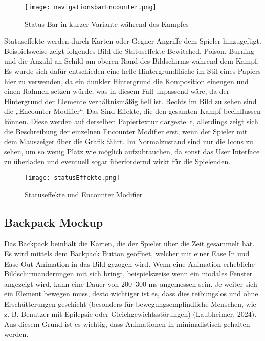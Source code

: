 \begin{figure}[H]
    \centering
    \texttt{[image: navigationsbarEncounter.png]}
    \caption{Status Bar in kurzer Variante während des Kampfes}
\end{figure}

Statuseffekte werden durch Karten oder Gegner-Angriffe dem Spieler hinzugefügt. Beispielsweise zeigt folgendes Bild die Statuseffekte Bewitched, Poison, Burning und die Anzahl an Schild am oberen Rand des Bildschirms während dem Kampf. Es wurde sich dafür entschieden eine helle Hintergrundfläche im Stil eines Papiers hier zu verwenden, da ein dunkler Hintergrund die Komposition einengen und einen Rahmen setzen würde, was in diesem Fall unpassend wäre, da der Hintergrund der Elemente verhältnismäßig hell ist. Rechts im Bild zu sehen sind die „Encounter Modifier“. Das Sind Effekte, die den gesamten Kampf beeinflussen können. Diese werden auf derselben Papiertextur dargestellt, allerdings zeigt sich die Beschreibung der einzelnen Encounter Modifier erst, wenn der Spieler mit dem Mauszeiger über die Grafik fährt. Im Normalzustand sind nur die Icons zu sehen, um so wenig Platz wie möglich aufzubrauchen, da sonst das User Interface zu überladen und eventuell sogar überfordernd wirkt für die Spielenden.

\begin{figure}[H]
    \centering
    \texttt{[image: statusEffekte.png]}
    \caption{Statuseffekte und Encounter Modifier}
\end{figure}

\subsection{Backpack Mockup}

Das Backpack beinhält die Karten, die der Spieler über die Zeit gesammelt hat. Es wird mittels dem Backpack Button geöffnet, welcher mit einer Ease In und Ease Out Animation in das Bild gezogen wird. Wenn eine Animation erhebliche Bildschirmänderungen mit sich bringt, beispielsweise wenn ein modales Fenster angezeigt wird, kann eine Dauer von 200–300 ms angemessen sein. Je weiter sich ein Element bewegen muss, desto wichtiger ist es, dass dies reibungslos und ohne Erschütterungen geschieht (besonders für bewegungsempfindliche Menschen, wie z. B. Benutzer mit Epilepsie oder Gleichgewichtsstörungen) (Laubheimer, 2024). Aus diesem Grund ist es wichtig, dass Animationen in \FF minimalistisch gehalten werden.

